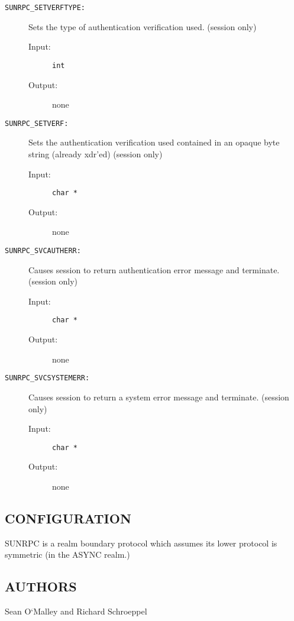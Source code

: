\begin{description}
\item[{\tt SUNRPC\_SETVERFTYPE:}]
Sets the type of authentication verification used.  (session only) 
\begin{description}
\item[{\rm Input:}] {\tt int  }
\item[{\rm Output:}] none
\end{description}

\item[{\tt SUNRPC\_SETVERF:}]
Sets the authentication verification used contained in an 
opaque byte string (already xdr'ed) (session only) 
\begin{description}
\item[{\rm Input:}] {\tt char *   }
\item[{\rm Output:}] none
\end{description}

\item[{\tt SUNRPC\_SVCAUTHERR:}]
Causes session to return authentication error message and 
terminate.  (session only) 
\begin{description}
\item[{\rm Input:}] {\tt char *   }
\item[{\rm Output:}] none
\end{description}

\item[{\tt SUNRPC\_SVCSYSTEMERR:}]
Causes session to return a system error message and 
terminate.  (session only) 
\begin{description}
\item[{\rm Input:}] {\tt char *   }
\item[{\rm Output:}] none
\end{description}

\end{description}

\subsection*{CONFIGURATION}

SUNRPC is a realm
boundary protocol which assumes
its lower protocol is symmetric (in the ASYNC realm.)


\subsection*{AUTHORS}

\noindent Sean O`Malley and Richard Schroeppel
